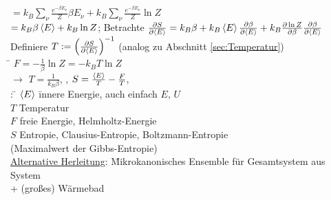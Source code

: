 \begin{tabbing}
\>$=k_B \sum\limits_\nu \frac{e^{-\beta E_\nu}}{Z} \beta E_\nu + k_B \sum\limits_\nu \frac{e^{-\beta E_\nu}}{Z} \ln Z$\\
\>$=k_B \beta \left\langle E \right\rangle + k_B \ln Z$; Betrachte $\frac{\partial S}{\partial \left\langle E \right\rangle} = k_B \beta + k_B \left\langle E \right\rangle \frac{\partial \beta}{\partial \left\langle E \right\rangle} + k_B \frac{\partial \ln Z}{\partial \beta} \frac{\partial \beta}{\partial \left\langle E \right\rangle}$\\
Definiere $T\vcentcolon = \left( \frac{\partial S}{\partial \left\langle E \right\rangle} \right)^{-1}$ (analog zu Abschnitt \ref{sec:Temperatur})\\
\hspace{4em} \= \kill
\> $F = -\frac{1}{\beta} \ln Z = - k_B T \ln Z$\\
$\rightarrow$\> $T = \frac{1}{k_B \beta}$, , $S = \frac{\left\langle E \right\rangle}{T} - \frac{F}{T}$, \\
: \= $\left\langle E \right\rangle$ \= innere Energie, auch einfach $E$, $U$\\
\>$T$\> Temperatur\\
\>$F$\> freie Energie, Helmholtz-Energie\\
\>$S$\> Entropie, Clausius-Entropie, Boltzmann-Entropie \\\>\>(Maximalwert der Gibbs-Entropie)\\
\uline{Alternative Herleitung}: \=Mikrokanonisches Ensemble für Gesamtsystem aus System\\\>\> + (großes) Wärmebad
\end{tabbing}


